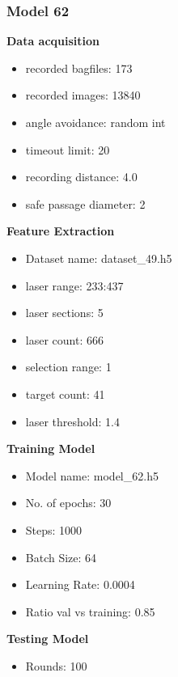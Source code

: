\subsubsection{Model 62\label{model_62} }
\begin{multicols}{2}\textbf{Data acquisition}
\begin{itemize}
\setlength\itemsep{0.1em}
\item recorded bagfiles: 173
\item recorded images: 13840
\item angle avoidance: random int
\item timeout limit: 20
\item recording distance: 4.0
\item safe passage diameter: 2
\end{itemize}
\textbf{Feature Extraction}
\begin{itemize}
\setlength\itemsep{0.1em}
\item Dataset name: dataset\_49.h5
\item  laser range: 233:437
\item  laser sections: 5
\item  laser count: 666
\item  selection range: 1
\item  target count: 41
\item  laser threshold: 1.4
\end{itemize}
\columnbreak
\textbf{Training Model}
\begin{itemize}
\setlength\itemsep{0.1em}
\item  Model name: model\_62.h5
\item  No. of epochs: 30
\item  Steps: 1000
\item  Batch Size: 64
\item  Learning Rate: 0.0004
\item  Ratio val vs training: 0.85
\end{itemize}
\textbf{Testing Model}
\begin{itemize}
\setlength\itemsep{0.1em}
\item Rounds: 100
\newline
\newline
\newline
\newline
\newline
\newline
\newline
\newline

\end{itemize}
\end{multicols}
